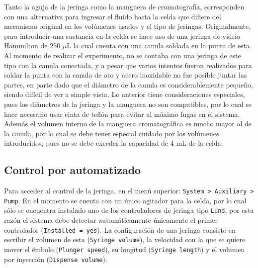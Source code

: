 	Tanto la aguja de la jeringa como la manguera de cromatografía, corresponden con una alternativa para ingresar el fluido hasta la celda que difiere del mecanismo original en los volúmenes usados y el tipo de jeringas. Originalmente, para introducir una sustancia en la celda se hace uso de una jeringa de vidrio Hammilton de 250 $\mu$L la cual cuenta con una canula soldada en la punta de esta. Al momento de realizar el experimento, no se contaba con una jeringa de este tipo con la canula conectada, y a pesar que varios intentos fueron realizados para soldar la punta con la canula de oro y acero inoxidable no fue posible juntar las partes, en parte dado que el diámetro de la canula es considerablemente pequeño, siendo difícil de ver a simple vista. Lo anterior tiene consideraciones especiales, pues los diámetros de la jeringa y la manguera no son compatibles, por lo cual se hace necesario usar cinta de teflón para evitar al máximo fugas en el sistema. Además el volumen interno de la manguera cromatogr\'afica es mucho mayor al de la canula, por lo cual se debe tener especial cuidado por los volúmenes introducidos, pues no se debe exceder la capacidad de 4 mL de la celda.
	
	\subsection{Control por automatizado}\label{ssec: jeringa}
	Para acceder al control de la jeringa, en el menú superior: \texttt{System > Auxiliary > Pump}. En el momento se cuenta con un único agitador para la celda, por lo cual sólo se encuentra instalado uno de los controladores de jeringa tipo \texttt{Lund}, por esta razón el sistema debe detectar automáticamente únicamente el primer controlador (\texttt{Installed = yes}). La configuración de una jeringa consiste en escribir el volumen de esta (\texttt{Syringe volume}), la velocidad con la que se quiere mover el émbolo (\texttt{Plunger speed}), su longitud (\texttt{Syringe length}) y el volumen por inyección (\texttt{Dispense volume}).
	
